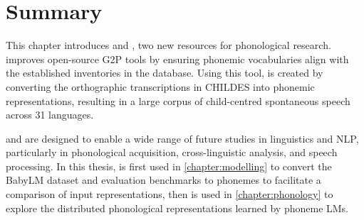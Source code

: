 

\section{Summary}

This chapter introduces \gpp and \ipachildes, two new resources for phonological research. \gpp improves open-source G2P tools by ensuring phonemic vocabularies align with the established inventories in the \phoible database. Using this tool, \ipachildes is created by converting the orthographic transcriptions in CHILDES into phonemic representations, resulting in a large corpus of child-centred spontaneous speech across 31 languages.

\gpp and \ipachildes are designed to enable a wide range of future studies in linguistics and NLP, particularly in phonological acquisition, cross-linguistic analysis, and speech processing. In this thesis, \gpp is first used in \cref{chapter:modelling} to convert the BabyLM dataset and evaluation benchmarks to phonemes to facilitate a comparison of input representations, then \ipachildes is used in \cref{chapter:phonology} to explore the distributed phonological representations learned by phoneme LMs. 





